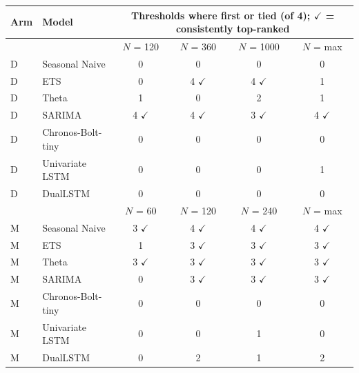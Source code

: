 \begin{tabular}{llcccc}
\toprule
Arm & Model & \multicolumn{4}{c}{Thresholds where first or tied (of 4); $\checkmark$ = consistently top-ranked} \\
\midrule
 & & $N$ = 120 & $N$ = 360 & $N$ = 1000 & $N$ = max \\
D & Seasonal Naive & 0 & 0 & 0 & 0 \\
D & ETS & 0 & 4 $\checkmark$ & 4 $\checkmark$ & 1 \\
D & Theta & 1 & 0 & 2 & 1 \\
D & SARIMA & 4 $\checkmark$ & 4 $\checkmark$ & 3 $\checkmark$ & 4 $\checkmark$ \\
D & Chronos-Bolt-tiny & 0 & 0 & 0 & 0 \\
D & Univariate LSTM & 0 & 0 & 0 & 1 \\
D & DualLSTM & 0 & 0 & 0 & 0 \\
\midrule
 & & $N$ = 60 & $N$ = 120 & $N$ = 240 & $N$ = max \\
M & Seasonal Naive & 3 $\checkmark$ & 4 $\checkmark$ & 4 $\checkmark$ & 4 $\checkmark$ \\
M & ETS & 1 & 3 $\checkmark$ & 3 $\checkmark$ & 3 $\checkmark$ \\
M & Theta & 3 $\checkmark$ & 3 $\checkmark$ & 3 $\checkmark$ & 3 $\checkmark$ \\
M & SARIMA & 0 & 3 $\checkmark$ & 3 $\checkmark$ & 3 $\checkmark$ \\
M & Chronos-Bolt-tiny & 0 & 0 & 0 & 0 \\
M & Univariate LSTM & 0 & 0 & 1 & 0 \\
M & DualLSTM & 0 & 2 & 1 & 2 \\
\bottomrule
\end{tabular}
